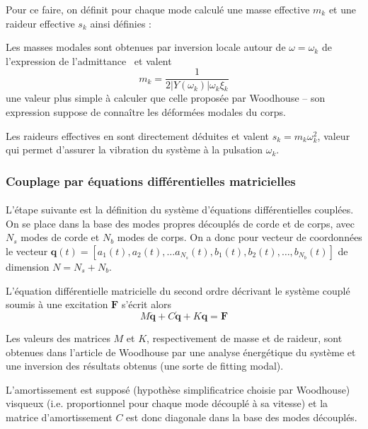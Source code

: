 Pour ce faire, on définit pour chaque mode calculé une masse effective
\( m_k \) et une raideur effective \( s_k \) ainsi définies :

  Les masses modales sont obtenues par inversion locale autour de
\( \omega = \omega_k \) de l'expression de l'admittance~\cite{pate14:phd} et
valent \[ m_k = \frac{1}{2 |Y(\omega_k)| \omega{}_k \xi{}_k} \] une valeur plus
simple à calculer que celle proposée par Woodhouse -- son expression suppose de
connaître les déformées modales du corps.

  Les raideurs effectives en sont directement déduites et valent
\( s_k = m_k \omega{}_k^2 \), valeur qui permet d'assurer la vibration du système
à la pulsation \( \omega{}_k \).

\subsubsection{Couplage par équations différentielles matricielles}

  \paragraph{}
  L'étape suivante est la définition du système d'équations différentielles
cou\-plées. On se place dans la base des modes propres découplés de corde et de corps,
avec \( N_s \) modes de corde et \( N_b \) modes de corps. On a donc
pour vecteur de coordonnées le vecteur
  \( \bm{q}(t) = [a_1(t), a_2(t), \dots a_{N_s}(t),
    b_1(t), b_2(t), \dots, b_{N_b}(t)] \) de dimension
\( N = N_s + N_b \).

  L'équation différentielle matricielle du second ordre décrivant le système
couplé soumis à une excitation \( \bm{F} \) s'écrit alors
  \[ \label{eq:diff_second}
    M \ddot{\bm{q}} + C \dot{\bm{q}} + K \bm{q} = \bm{F} \]

  Les valeurs des matrices \( M \) et \( K \), respectivement de masse et de
raideur, sont obtenues dans l'article de Woodhouse par une analyse énergétique
du système et une inversion des résultats obtenus (une sorte de fitting
modal).

  L'amortissement est supposé (hypothèse simplificatrice choisie par Woodhouse)
visqueux (i.e. proportionnel pour chaque mode découplé à sa vitesse) et la
matrice d'amortissement \( C \) est donc diagonale dans la base des
modes découplés.


